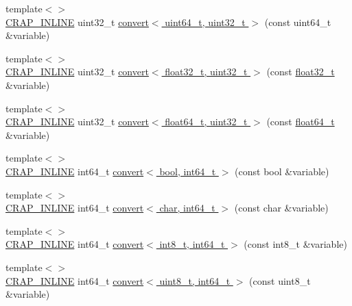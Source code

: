 \begin{DoxyCompactItemize}
\item 
{\footnotesize template$<$$>$ }\\\hyperlink{config__x86_8h_a5a40526b8d842e7ff731509998bb0f1c}{C\+R\+A\+P\+\_\+\+I\+N\+L\+I\+N\+E} uint32\+\_\+t \hyperlink{namespacecrap_a81ce6b5e98545b85b8e7422c84baa748}{convert$<$ uint64\+\_\+t, uint32\+\_\+t $>$} (const uint64\+\_\+t \&variable)
\item 
{\footnotesize template$<$$>$ }\\\hyperlink{config__x86_8h_a5a40526b8d842e7ff731509998bb0f1c}{C\+R\+A\+P\+\_\+\+I\+N\+L\+I\+N\+E} uint32\+\_\+t \hyperlink{namespacecrap_a4887e3e1e080a125d1fcf5d1a919a779}{convert$<$ float32\+\_\+t, uint32\+\_\+t $>$} (const \hyperlink{crap__types_8h_a4611b605e45ab401f02cab15c5e38715}{float32\+\_\+t} \&variable)
\item 
{\footnotesize template$<$$>$ }\\\hyperlink{config__x86_8h_a5a40526b8d842e7ff731509998bb0f1c}{C\+R\+A\+P\+\_\+\+I\+N\+L\+I\+N\+E} uint32\+\_\+t \hyperlink{namespacecrap_ad5f38be538af7cc35e5b0aaea508ef2d}{convert$<$ float64\+\_\+t, uint32\+\_\+t $>$} (const \hyperlink{crap__types_8h_ac55f3ae81b5bc9053760baacf57e47f4}{float64\+\_\+t} \&variable)
\item 
{\footnotesize template$<$$>$ }\\\hyperlink{config__x86_8h_a5a40526b8d842e7ff731509998bb0f1c}{C\+R\+A\+P\+\_\+\+I\+N\+L\+I\+N\+E} int64\+\_\+t \hyperlink{namespacecrap_abe992f6296bfcaefca732ef4c64e1fac}{convert$<$ bool, int64\+\_\+t $>$} (const bool \&variable)
\item 
{\footnotesize template$<$$>$ }\\\hyperlink{config__x86_8h_a5a40526b8d842e7ff731509998bb0f1c}{C\+R\+A\+P\+\_\+\+I\+N\+L\+I\+N\+E} int64\+\_\+t \hyperlink{namespacecrap_afbde06f2531b3d87f267757ea0ff5ba6}{convert$<$ char, int64\+\_\+t $>$} (const char \&variable)
\item 
{\footnotesize template$<$$>$ }\\\hyperlink{config__x86_8h_a5a40526b8d842e7ff731509998bb0f1c}{C\+R\+A\+P\+\_\+\+I\+N\+L\+I\+N\+E} int64\+\_\+t \hyperlink{namespacecrap_abdb77b47aa38870c7fce4348dbb76a57}{convert$<$ int8\+\_\+t, int64\+\_\+t $>$} (const int8\+\_\+t \&variable)
\item 
{\footnotesize template$<$$>$ }\\\hyperlink{config__x86_8h_a5a40526b8d842e7ff731509998bb0f1c}{C\+R\+A\+P\+\_\+\+I\+N\+L\+I\+N\+E} int64\+\_\+t \hyperlink{namespacecrap_aac52dc6b36db97bd31369f7dc93010dc}{convert$<$ uint8\+\_\+t, int64\+\_\+t $>$} (const uint8\+\_\+t \&variable)

\end{DoxyCompactItemize}
